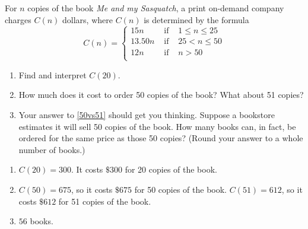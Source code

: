 {\label{piecewiseordering} For $n$ copies of the book \textit{Me and my Sasquatch}, a print on-demand company charges $C(n)$ dollars, where $C(n)$ is determined by the formula \[{\displaystyle C(n) = \left\{ \begin{array}{rcl}  15n & \mbox{ if } & 1 \leq n \leq 25  \\
                                                            13.50n  & \mbox{ if } & 25 < n \leq 50 \\
                                                            12n & \mbox{ if } & n > 50 \\
                                     \end{array} \right. }\]
                                     
                                     
\begin{enumerate}

\item  Find and interpret $C(20)$.  %

\item  \label{50vs51} How much does it cost to order 50 copies of the book?  What about 51 copies? %

\item  Your answer to \ref{50vs51} should get you thinking. Suppose a bookstore estimates it will sell 50 copies of the book.  How many books can, in fact, be ordered for the same price as those 50 copies? (Round your answer to a  whole number of books.)  %

\end{enumerate}
 }
{\begin{enumerate}

\item $C(20) = 300$.  It costs $\$300$ for 20 copies of the book.

\item $C(50) = 675$, so it costs $\$ 675$ for 50 copies of the book.  $C(51) = 612$, so it costs $\$ 612$ for 51 copies of the book.

\item $56$ books.

\end{enumerate}}